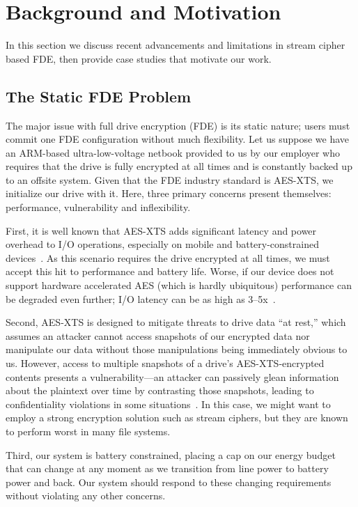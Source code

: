 \section{Background and Motivation}\label{sec:motivation}

In this section we discuss recent advancements and limitations in stream cipher
based FDE, then provide \numCases case studies that motivate our work.


\subsection{The Static FDE Problem}

The major issue with full drive encryption (FDE) is its static nature; users
must commit one FDE configuration without much flexibility. Let us suppose we
have an ARM-based ultra-low-voltage netbook provided to us by our employer who
requires that the drive is fully encrypted at all times and is constantly backed
up to an offsite system. Given that the FDE industry standard is AES-XTS, we
initialize our drive with it. Here, three primary concerns present themselves:
performance, vulnerability and inflexibility.

First, it is well known that AES-XTS adds significant latency and power overhead
to I/O operations, especially on mobile and battery-constrained
devices~\cite{google-engadget, android-M-mobile-motivation,
android-M-mobile-motivation-2}. As this scenario requires the drive encrypted at
all times, we must accept this hit to performance and battery life. Worse, if
our device does not support hardware accelerated AES (which is hardly
ubiquitous) performance can be degraded even further; I/O latency can be as high
as 3--5x~\cite{StrongBox}.

Second, AES-XTS is designed to mitigate threats to drive data ``at rest,'' which
assumes an attacker cannot access snapshots of our encrypted data nor manipulate
our data without those manipulations being immediately obvious to us. However,
access to multiple snapshots of a drive's AES-XTS-encrypted contents presents a
vulnerability---an attacker can passively glean information about the plaintext
over time by contrasting those snapshots, leading to confidentiality violations
in some situations~\cite{XEX, XTS}. In this case, we might want to employ a
strong encryption solution such as stream ciphers, but they are known to perform
worst in many file systems.

Third, our system is battery constrained, placing a cap on our energy budget
that can change at any moment as we transition from line power to battery power
and back. Our system should respond to these changing requirements without
violating any other concerns.


